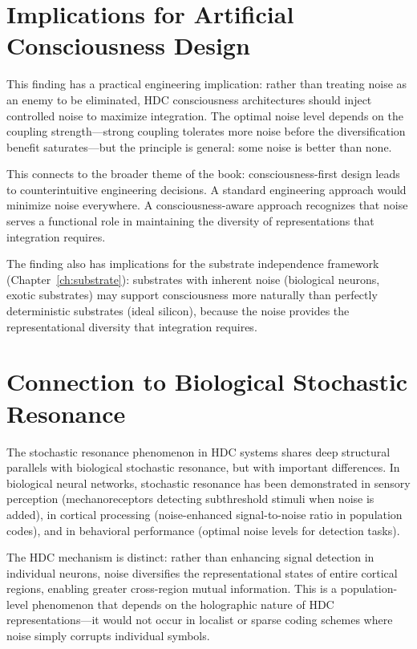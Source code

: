 \documentclass[12pt]{book}
\begin{document}
\section{Implications for Artificial Consciousness Design}

This finding has a practical engineering implication: rather than treating noise as an enemy to be eliminated, HDC consciousness architectures should inject controlled noise to maximize integration. The optimal noise level depends on the coupling strength---strong coupling tolerates more noise before the diversification benefit saturates---but the principle is general: some noise is better than none.

This connects to the broader theme of the book: consciousness-first design leads to counterintuitive engineering decisions. A standard engineering approach would minimize noise everywhere. A consciousness-aware approach recognizes that noise serves a functional role in maintaining the diversity of representations that integration requires.

The finding also has implications for the substrate independence framework (Chapter~\ref{ch:substrate}): substrates with inherent noise (biological neurons, exotic substrates) may support consciousness more naturally than perfectly deterministic substrates (ideal silicon), because the noise provides the representational diversity that integration requires.

\section{Connection to Biological Stochastic Resonance}

The stochastic resonance phenomenon in HDC systems shares deep structural parallels with biological stochastic resonance, but with important differences. In biological neural networks, stochastic resonance has been demonstrated in sensory perception (mechanoreceptors detecting subthreshold stimuli when noise is added), in cortical processing (noise-enhanced signal-to-noise ratio in population codes), and in behavioral performance (optimal noise levels for detection tasks).

The HDC mechanism is distinct: rather than enhancing signal detection in individual neurons, noise diversifies the representational states of entire cortical regions, enabling greater cross-region mutual information. This is a population-level phenomenon that depends on the holographic nature of HDC representations---it would not occur in localist or sparse coding schemes where noise simply corrupts individual symbols.
\end{document}
